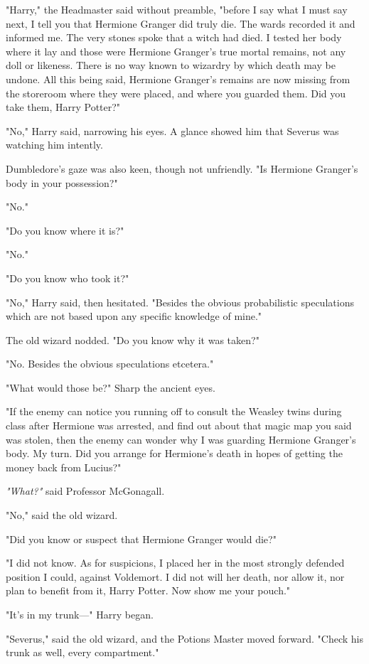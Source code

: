 "Harry," the Headmaster said without preamble, "before I say what I must say
next, I tell you that Hermione Granger did truly die. The wards recorded it and
informed me. The very stones spoke that a witch had died. I tested her body
where it lay and those were Hermione Granger's true mortal remains, not any
doll or likeness. There is no way known to wizardry by which death may be
undone. All this being said, Hermione Granger's remains are now missing from
the storeroom where they were placed, and where you guarded them. Did you take
them, Harry Potter?"

"No," Harry said, narrowing his eyes. A glance showed him that Severus was
watching him intently.

Dumbledore's gaze was also keen, though not unfriendly. "Is Hermione Granger's
body in your possession?"

"No."

"Do you know where it is?"

"No."

"Do you know who took it?"

"No," Harry said, then hesitated. "Besides the obvious probabilistic
speculations which are not based upon any specific knowledge of mine."

The old wizard nodded. "Do you know why it was taken?"

"No. Besides the obvious speculations etcetera."

"What would those be?" Sharp the ancient eyes.

"If the enemy can notice you running off to consult the Weasley twins during
class after Hermione was arrested, and find out about that magic map you said
was stolen, then the enemy can wonder why I was guarding Hermione Granger's
body. My turn. Did you arrange for Hermione's death in hopes of getting the
money back from Lucius?"

\emph{"What?"} said Professor McGonagall.

"No," said the old wizard.

"Did you know or suspect that Hermione Granger would die?"

"I did not know. As for suspicions, I placed her in the most strongly defended
position I could, against Voldemort. I did not will her death, nor allow it,
nor plan to benefit from it, Harry Potter. Now show me your pouch."

"It's in my trunk\mbox{---}" Harry began.

"Severus," said the old wizard, and the Potions Master moved forward. "Check
his trunk as well, every compartment."


